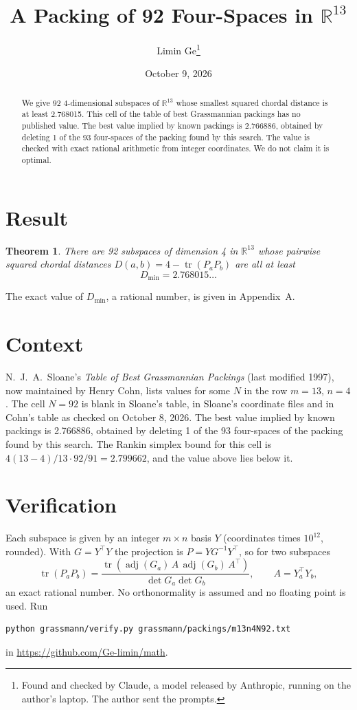 \documentclass[11pt,a4paper]{article}
\title{A Packing of 92 Four-Spaces in $\mathbb{R}^{13}$}
\author{Limin Ge\thanks{Found and checked by Claude, a model released by Anthropic, running on the author's laptop. The author sent the prompts.}}
\date{October 9, 2026}
\newtheorem*{theorem}{Theorem}
\begin{document}
\maketitle
\begin{abstract}
We give 92 4-dimensional subspaces of $\mathbb{R}^{13}$ whose smallest squared chordal distance is at least 2.768015. This cell of the table of best Grassmannian packings has no published value. The best value implied by known packings is 2.766886, obtained by deleting 1 of the 93 four-spaces of the packing found by this search. The value is checked with exact rational arithmetic from integer coordinates. We do not claim it is optimal.
\end{abstract}

\section{Result}
\begin{theorem}
There are 92 subspaces of dimension 4 in $\mathbb{R}^{13}$ whose pairwise squared chordal distances $D(a,b) = 4 - \operatorname{tr}(P_aP_b)$ are all at least
\[ D_{\min} = 2.768015\ldots \]
\end{theorem}
The exact value of $D_{\min}$, a rational number, is given in Appendix~A.


\section{Context}
N.~J.~A.~Sloane's \emph{Table of Best Grassmannian Packings} (last modified 1997), now maintained by Henry Cohn, lists values for some $N$ in the row $m=13$, $n=4$. The cell $N=92$ is blank in Sloane's table, in Sloane's coordinate files and in Cohn's table as checked on October 8, 2026. The best value implied by known packings is 2.766886, obtained by deleting 1 of the 93 four-spaces of the packing found by this search. The Rankin simplex bound for this cell is $4(13-4)/13\cdot 92/91 = 2.799662$, and the value above lies below it.


\section{Verification}
Each subspace is given by an integer $m\times n$ basis $Y$ (coordinates times $10^{12}$, rounded). With $G=Y^\top Y$ the projection is $P=YG^{-1}Y^\top$, so for two subspaces
\[ \operatorname{tr}(P_aP_b)=\frac{\operatorname{tr}(\operatorname{adj}(G_a)\,A\,\operatorname{adj}(G_b)\,A^\top)}{\det G_a\det G_b},\qquad A=Y_a^\top Y_b, \]
an exact rational number. No orthonormality is assumed and no floating point is used. Run
\begin{verbatim}
python grassmann/verify.py grassmann/packings/m13n4N92.txt
\end{verbatim}
in \url{https://github.com/Ge-limin/math}.
\end{document}
